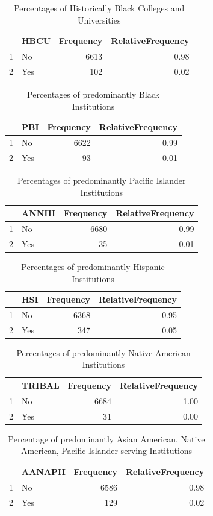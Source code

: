 \documentclass{article}\usepackage[]{graphicx}\usepackage[]{color}
\begin{document}
\begin{table}[ht]
\centering
\begin{tabular}{rlrr}
  \hline
 & HBCU & Frequency & RelativeFrequency \\ 
  \hline
1 & No & 6613 & 0.98 \\ 
  2 & Yes & 102 & 0.02 \\ 
   \hline
\end{tabular}
\caption{Percentages of Historically Black Colleges and Universities} 
\end{table}
\begin{table}[ht]
\centering
\begin{tabular}{rlrr}
  \hline
 & PBI & Frequency & RelativeFrequency \\ 
  \hline
1 & No & 6622 & 0.99 \\ 
  2 & Yes &  93 & 0.01 \\ 
   \hline
\end{tabular}
\caption{Percentages of predominantly Black Institutions} 
\end{table}
\begin{table}[ht]
\centering
\begin{tabular}{rlrr}
  \hline
 & ANNHI & Frequency & RelativeFrequency \\ 
  \hline
1 & No & 6680 & 0.99 \\ 
  2 & Yes &  35 & 0.01 \\ 
   \hline
\end{tabular}
\caption{Percentages of predominantly Pacific Islander Institutions} 
\end{table}
\begin{table}[ht]
\centering
\begin{tabular}{rlrr}
  \hline
 & HSI & Frequency & RelativeFrequency \\ 
  \hline
1 & No & 6368 & 0.95 \\ 
  2 & Yes & 347 & 0.05 \\ 
   \hline
\end{tabular}
\caption{Percentages of predominantly Hispanic Institutions} 
\end{table}
\begin{table}[ht]
\centering
\begin{tabular}{rlrr}
  \hline
 & TRIBAL & Frequency & RelativeFrequency \\ 
  \hline
1 & No & 6684 & 1.00 \\ 
  2 & Yes &  31 & 0.00 \\ 
   \hline
\end{tabular}
\caption{Percentages of predominantly Native American Institutions} 
\end{table}
\begin{table}[ht]
\centering
\begin{tabular}{rlrr}
  \hline
 & AANAPII & Frequency & RelativeFrequency \\ 
  \hline
1 & No & 6586 & 0.98 \\ 
  2 & Yes & 129 & 0.02 \\ 
   \hline
\end{tabular}
\caption{Percentage of predominantly Asian American, Native American, Pacific Islander-serving Institutions} 
\end{table}
\end{document}
